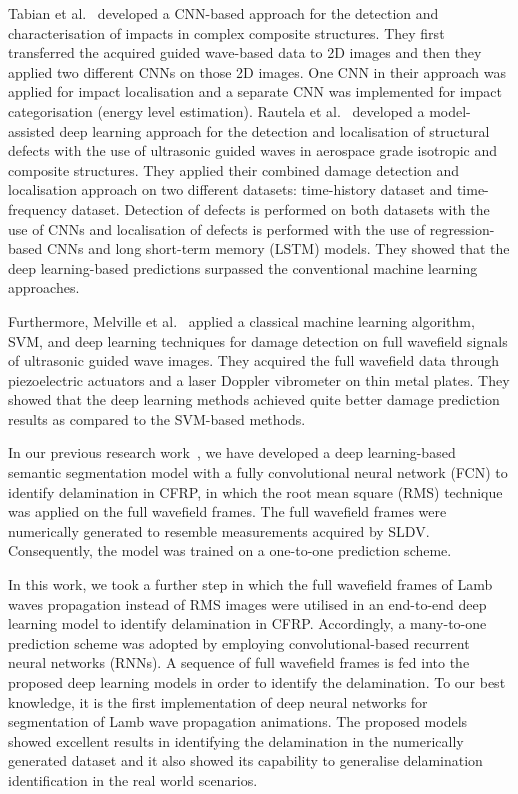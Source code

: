 Tabian et al.~\cite{Tabian2019} developed a CNN-based approach for the detection and characterisation of impacts in complex composite structures.
They first transferred the acquired guided wave-based data to 2D images and then they applied two different CNNs on those 2D images.
One CNN in their approach was applied for impact localisation and a separate CNN was implemented for impact categorisation (energy level estimation).
Rautela et al.~\cite{rautela2021ultrasonic} developed a model-assisted deep learning approach for the detection and localisation of structural defects
with the use of ultrasonic guided waves in aerospace grade isotropic and composite structures. 
They applied their combined damage detection and localisation approach on two different datasets: time-history dataset and time-frequency dataset. 
Detection of defects is performed on both datasets with the use of CNNs and localisation of defects is performed with the use of regression-based CNNs and long short-term memory (LSTM) models. 
They showed that the deep learning-based predictions surpassed the conventional machine learning approaches.

Furthermore, Melville et al.~\cite{Melville2018} applied a classical machine 
learning algorithm, SVM, and deep learning techniques for damage detection on 
full wavefield signals of ultrasonic guided wave images.
They acquired the full wavefield data through piezoelectric actuators and a laser Doppler vibrometer on thin metal plates. 
They showed that the deep learning methods achieved quite better damage prediction results as compared to the SVM-based methods. 

In our previous research work~\cite{Ijjeh2021}, we have developed a deep learning-based semantic segmentation model with a fully convolutional neural network (FCN) to identify delamination in CFRP, in which the root mean square (RMS) technique was applied on the full wavefield frames. 
The full wavefield frames were numerically generated to resemble measurements acquired by SLDV.  
Consequently, the model was trained on a one-to-one prediction scheme.

In this work, we took a further step in which the full wavefield frames of Lamb waves propagation instead of RMS images were utilised in an end-to-end deep learning model to identify delamination in CFRP.
Accordingly, a many-to-one prediction scheme was adopted by employing convolutional-based recurrent neural networks (RNNs).
A sequence of full wavefield frames is fed into the proposed deep learning models in order to identify the delamination.
To our best knowledge, it is the first implementation of deep neural networks for segmentation of Lamb wave propagation animations.
The proposed models showed excellent results in identifying the delamination in the numerically generated dataset and it also showed its capability to generalise delamination identification in the real world scenarios.   
